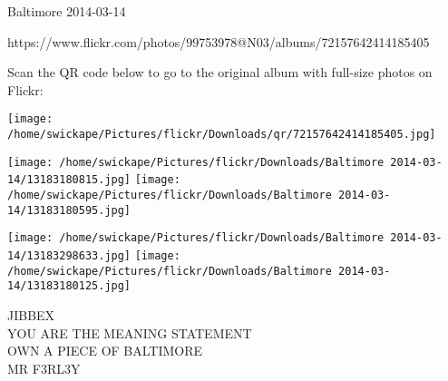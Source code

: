 \documentclass[10pt,letterpaper]{article}
\begin{document}
Baltimore 2014-03-14

https://www.flickr.com/photos/99753978@N03/albums/72157642414185405

Scan the QR code below to go to the original album with full-size photos on Flickr:

\texttt{[image: /home/swickape/Pictures/flickr/Downloads/qr/72157642414185405.jpg]}
\pagebreak

\texttt{[image: /home/swickape/Pictures/flickr/Downloads/Baltimore 2014-03-14/13183180815.jpg]}
\texttt{[image: /home/swickape/Pictures/flickr/Downloads/Baltimore 2014-03-14/13183180595.jpg]}

\texttt{[image: /home/swickape/Pictures/flickr/Downloads/Baltimore 2014-03-14/13183298633.jpg]}
\texttt{[image: /home/swickape/Pictures/flickr/Downloads/Baltimore 2014-03-14/13183180125.jpg]}

JIBBEX\\
YOU ARE THE MEANING STATEMENT\\
OWN A PIECE OF BALTIMORE\\
MR F3RL3Y\\
\pagebreak
\end{document}
